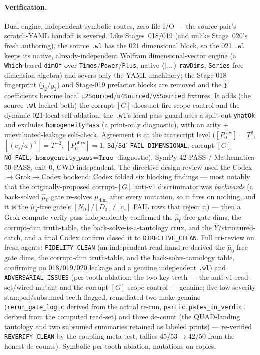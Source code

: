\paragraph{Verification.}
Dual-engine, independent symbolic routes, zero file I/O --- the source pair's scratch-YAML handoff is severed. Like
Stages~018/019 (and unlike Stage~020's fresh authoring), the source \texttt{.wl} has the 021 dimensional block, so the 021
\texttt{.wl} keeps its native, already-independent Wolfram dimensional-vector engine (a \texttt{Which}-based \texttt{dimOf}
over \texttt{Times}/\texttt{Power}/\texttt{Plus}, native \(\langle|\ldots|\rangle\) \texttt{rawDims}, \texttt{Series}-free
dimension algebra) and severs only the YAML machinery; the Stage-018 fingerprint (\(j_2\)/\(y_2\)) and Stage-019 prefactor
blocks are removed and the \(\hat Y\) coefficients become local \texttt{u2Sourced}/\texttt{u4Sourced}/\texttt{v5Sourced}
fixtures. It adds (the source \texttt{.wl} lacked both) the corrupt-\([G]\)-does-not-fire scope control and the dynamic
021-local self-ablation; the \texttt{.wl}'s local pass-guard uses a split-out \texttt{yhatOk} and excludes
\texttt{homogeneityPass} (a print-only diagnostic), with an arity + unevaluated-leakage self-check. Agreement is at the
transcript level (\([P_0^{\mathrm{raw}}]=T^2\), \([(c_s/a)^2]=T^{-2}\), \([P_0^{\mathrm{phys}}]=1\), \(\texttt{3d}/\texttt{3d}'\)
\texttt{FAIL\_DIMENSIONAL}, corrupt-\([G]\) \texttt{NO\_FAIL}, \(\texttt{homogeneity\_pass}=\texttt{True}\) diagnostic). SymPy 42
PASS / Mathematica 50 PASS, exit 0, CWD-independent. The directive design-review used the Codex\(\to\)Grok\(\to\)Codex
bookend: Codex folded six blocking findings --- most notably that the originally-proposed corrupt-\([G]\) anti-v1
discriminator was \emph{backwards} (a back-solved \(\hat\mu_0\) gate re-solves \(\mu_{\mathrm{dim}}\) after every mutation, so
it fires on nothing, and it is the \(\hat\mu_0\)-free gate's \([N_0]/[D_0]/[c_s]\) FAIL rows that reject it) --- then a Grok
compute-verify pass independently confirmed the \(\hat\mu_0\)-free gate dims, the corrupt-dim truth-table, the
back-solve-is-a-tautology crux, and the \(\hat Y\)/structured-catch, and a final Codex confirm closed it to
\texttt{DIRECTIVE\_CLEAN}. Full tri-review on fresh agents: \texttt{FIDELITY\_CLEAN} (an independent read hand-re-derived the
\(\hat\mu_0\)-free gate dims, the corrupt-dim truth-table, and the back-solve-tautology table, confirming no 018/019/020
leakage and a genuine independent \texttt{.wl}) and \texttt{ADVERSARIAL\_ISSUES} (per-tooth ablation: the two key teeth --- the
anti-v1 read-set/wired-mutant and the corrupt-\([G]\) scope control --- genuine; five low-severity stamped/subsumed teeth
flagged, remediated two make-genuine (\texttt{rerun\_gate\_logic} derived from the actual re-run, \texttt{participates\_in\_verdict}
derived from the computed read-set) and three de-count (the QUAD-landing tautology and two subsumed summaries retained as
labeled prints) --- re-verified \texttt{REVERIFY\_CLEAN} by the coupling meta-test, tallies 45/53\(\to\)42/50 from the honest
de-counts). Symbolic per-tooth ablation, mutations on copies.
